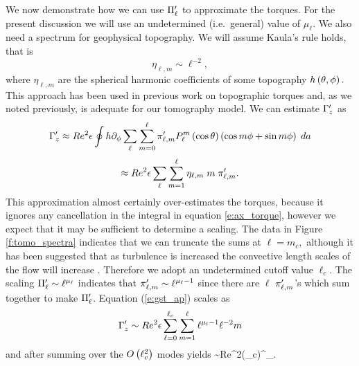 We now demonstrate how we can use $\Pi^{\prime}_{\ell}$ to approximate the torques. For the present discussion we will use an undetermined (i.e.~general) value of $\mu_{\ell}$. 
We also need a spectrum for geophysical topography. We will assume Kaula's rule \citep{wK66} holds, that is \[\eta_{\ell,m}\sim \ell^{-2},\]
 where $\eta_{\ell,m}$ are the spherical harmonic coefficients of some topography $h\left ( \theta,\phi\right ).$ This approach has been used in previous work on topographic torques \citep{mP23,vD25} and, as we noted previously, is adequate for our tomography model.
 We can estimate ${ {\Gamma}^{\prime}_z }$ as
 \[
		 { {\Gamma}^{\prime}_z } \approx Re^{2}\epsilon \oint h\partial_{\phi}\sum_{\ell}\sum_{m=0}^{\ell} \pi^{\prime}_{\ell,m} P_{\ell}^{m} \left (\cos\theta\right )\left ( \cos m\phi + \sin m\phi \right )    \;da\\
	 \]
 \begin{equation}
		       \approx Re^{2}\epsilon  \sum_{\ell}\sum_{m = 1}^{\ell}\eta_{\ell,m}\; m \;\pi^{\prime}_{\ell,m} .
	\label{e:gst_ap}
 \end{equation}
 This approximation almost certainly over-estimates the torques, because it ignores any cancellation in the integral in equation \eqref{e:ax_torque}, however we expect that it may be sufficient to determine a scaling. 
 The data in Figure \ref{f:tomo_spectra} indicates that we can truncate the sums at $ \ell = m_{c},$ although it has been suggested that as turbulence is increased the convective length scales of the flow will increase \citep{jA20, cG25}. Therefore we adopt an undetermined cutoff value $\ell_{c}$. The scaling $\Pi^{\prime}_{\ell}\sim \ell^{\mu_{\ell}}$ indicates that $\pi^{\prime}_{\ell,m}\sim \ell^{\mu_{\ell}-1}$ since there are $\ell$ $\pi^{\prime}_{\ell,m}$'s which sum together to make $\Pi^{\prime}_{\ell}$.  Equation (\ref{e:gst_ap}) scales as
 \[
	 { {\Gamma}^{\prime}_z } \sim  Re^{2}\epsilon \sum_{\ell=0}^{\ell_{c}}\sum_{m=1}^\ell \ell^{\mu_{l}-1} \ell^{-2}m
 \]
 and after summing over the $O\left ( \ell_{c}^{2}\right ) $ modes yields
 \be
 \Gstd\sim Re^{2}\epsilon\;(\ell_{c})^{\mu_{\ell}}.
 \label{e:gst_ap2}
 \ee
 


